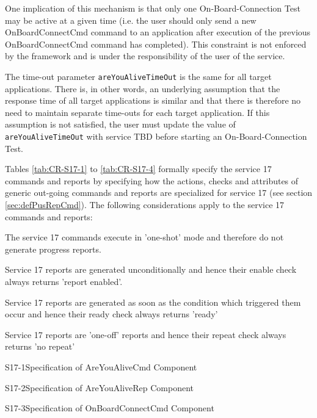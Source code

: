 \documentclass[a4paper,10pt]{article}
\newenvironment{fw_itemize}						%
{\begin{itemize}
  \setlength{\itemsep}{1mm}
  \setlength{\parskip}{0pt}
  \setlength{\parsep}{0pt}}
{\end{itemize}}
\newenvironment{cr_cmd}[2]
{
\begin{longtable}{|p{3cm}|p{9.6cm}|}
\caption{#2} \label{tab:CR-#1} \\
\hline
\rowcolor{light-gray}
\DTLforeach*{dbCmd}{\att=Attribute,\attValue=#1}
{\DTLiffirstrow{}{\\\hline}\att & \attValue}\\\hline
}
{\end{longtable}}
\newenvironment{cr_rep}[2]
{
\begin{longtable}{|c|p{10cm}|}
\caption{#2} \label{tab:CR-#1}\\
\hline
\rowcolor{light-gray}
\DTLforeach*{dbRep}{\att=Attribute,\attValue=#1}
{\DTLiffirstrow{}{\\\hline}\att & \attValue}\\\hline
}
{\end{longtable}}
\begin{document}
One implication of this mechanism is that only one On-Board-Connection Test may be active at a given time (i.e. the user should only send a new OnBoardConnectCmd command to an application after execution of the previous OnBoardConnectCmd command has completed). This constraint is not enforced by the framework and is under the responsibility of the user of the service.

The time-out parameter \texttt{areYouAliveTimeOut} is the same for all target applications. There is, in other words, an underlying assumption that the response time of all target applications is similar and that there is therefore no need to maintain separate time-outs for each target application. If this assumption is not satisfied, the user must update the value of \texttt{areYouAliveTimeOut} with service TBD before starting an On-Board-Connection Test.

Tables \ref{tab:CR-S17-1} to \ref{tab:CR-S17-4} formally specify the service 17 commands and reports by specifying how the actions, checks and attributes of generic out-going commands and reports are specialized for service 17 (see section \ref{sec:defPusRepCmd}). The following considerations apply to the service 17 commands and reports:

\begin{fw_itemize}
\item The service 17 commands execute in 'one-shot' mode and therefore do not generate progress reports.
\item Service 17 reports are generated unconditionally and hence their enable check always returns 'report enabled'.
\item Service 17 reports are generated as soon as the condition which triggered them occur and hence their ready check always returns 'ready'
\item Service 17 reports are 'one-off' reports and hence their repeat check always returns 'no repeat'
\end{fw_itemize}

\newpage
\begin{cr_cmd}{S17-1}{Specification of AreYouAliveCmd Component}
\end{cr_cmd}

\begin{cr_rep}{S17-2}{Specification of AreYouAliveRep Component}
\end{cr_rep}

\newpage
\begin{cr_cmd}{S17-3}{Specification of OnBoardConnectCmd Component}
\end{cr_cmd}
\end{document}
